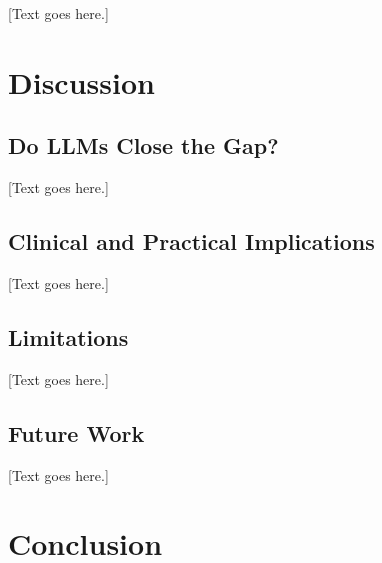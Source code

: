 \documentclass[12pt, a4paper]{article}
\begin{document}
[Text goes here.]

\section{Discussion}

\subsection{Do LLMs Close the Gap?}

[Text goes here.]

\subsection{Clinical and Practical Implications}

[Text goes here.]

\subsection{Limitations}

[Text goes here.]

\subsection{Future Work}

[Text goes here.]

\section{Conclusion}
\end{document}

